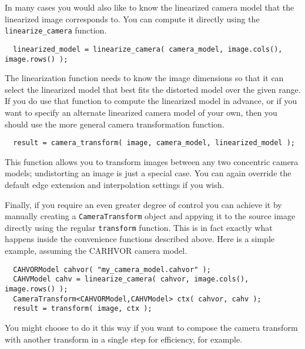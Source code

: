 In many cases you would also like to know the linearized camera model that the 
linearized image corresponds to.  You can compute it directly using the 
\verb#linearize_camera# function.
\begin{verbatim}
  linearized_model = linearize_camera( camera_model, image.cols(), image.rows() );
\end{verbatim}
The linearization function needs to know the image dimensions so that
it can select the linearized model that best fits the distorted model
over the given range.  If you do use that function to compute the
linearized model in advance, or if you want to specify an alternate
linearized camera model of your own, then you should use the more general 
camera transformation function.
\begin{verbatim}
  result = camera_transform( image, camera_model, linearized_model );
\end{verbatim}
This function allows you to transform images between any two concentric 
camera models; undistorting an image is just a special case.  You can again 
override the default edge extension and interpolation settings if you wish.

Finally, if you require an even greater degree of control you can
achieve it by manually creating a \verb#CameraTransform# object and
appying it to the source image directly using the regular
\verb#transform# function.  This is in fact exactly what happens inside 
the convenience functions described above.  Here is a simple example, 
assuming the CARHVOR camera model.
\begin{verbatim}
  CAHVORModel cahvor( "my_camera_model.cahvor" );
  CAHVModel cahv = linearize_camera( cahvor, image.cols(), image.rows() );
  CameraTransform<CAHVORModel,CAHVModel> ctx( cahvor, cahv );
  result = transform( image, ctx );
\end{verbatim}
You might choose to do it this way if you want to compose the camera
transform with another transform in a single step for efficiency, 
for example.
